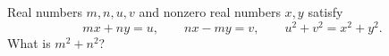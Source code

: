 Real numbers $m,n,u,v$ and nonzero real numbers $x,y$ satisfy
\[
mx+ny=u,\qquad nx-my=v,\qquad u^2+v^2=x^2+y^2 .
\]
What is $m^2+n^2$?
